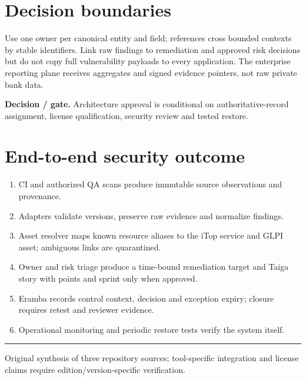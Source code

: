 \documentclass[10pt,letterpaper]{article}
\begin{document}
\section{Decision boundaries}
Use one owner per canonical entity and field; references cross bounded contexts by stable identifiers. Link raw findings to remediation and approved risk decisions but do not copy full vulnerability payloads to every application. The enterprise reporting plane receives aggregates and signed evidence pointers, not raw private bank data.\par
\textbf{Decision / gate.} Architecture approval is conditional on authoritative-record assignment, license qualification, security review and tested restore.\par
\section{End-to-end security outcome}
\begin{enumerate}
\item CI and authorized QA scans produce immutable source observations and provenance.
\item Adapters validate versions, preserve raw evidence and normalize findings.
\item Asset resolver maps known resource aliases to the iTop service and GLPI asset; ambiguous links are quarantined.
\item Owner and risk triage produce a time-bound remediation target and Taiga story with points and sprint only when approved.
\item Eramba records control context, decision and exception expiry; closure requires retest and reviewer evidence.
\item Operational monitoring and periodic restore tests verify the system itself.
\end{enumerate}
\vfill\noindent\color{muted}\rule{\linewidth}{0.4pt}\par\scriptsize Original synthesis of three repository sources; tool-specific integration and license claims require edition/version-specific verification.\normalsize
\end{document}
